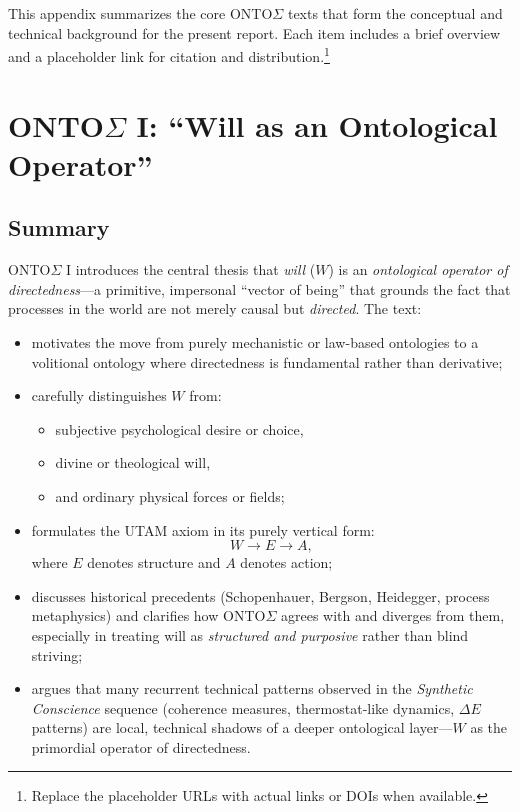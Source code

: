 \documentclass[12pt,a4paper]{report}
\newcommand{\Will}{W}
\newcommand{\Struct}{E}
\newcommand{\Act}{A}
\begin{document}
This appendix summarizes the core ONTO$\Sigma$ texts that form the conceptual and technical background for the present report. Each item includes a brief overview and a placeholder link for citation and distribution.\footnote{Replace the placeholder URLs with actual links or DOIs when available.}

\section*{ONTO$\Sigma$ I: ``Will as an Ontological Operator''}

\subsection*{Summary}

ONTO$\Sigma$ I introduces the central thesis that \emph{will} (\(\Will\)) is an \emph{ontological operator of directedness}---a primitive, impersonal ``vector of being'' that grounds the fact that processes in the world are not merely causal but \emph{directed}. The text:

\begin{itemize}[leftmargin=2em]
    \item motivates the move from purely mechanistic or law-based ontologies to a volitional ontology where directedness is fundamental rather than derivative;
    \item carefully distinguishes \(\Will\) from:
    \begin{itemize}
        \item subjective psychological desire or choice,
        \item divine or theological will,
        \item and ordinary physical forces or fields;
    \end{itemize}
    \item formulates the UTAM axiom in its purely vertical form:
    \[
        \Will \to \Struct \to \Act,
    \]
    where \(\Struct\) denotes structure and \(\Act\) denotes action;
    \item discusses historical precedents (Schopenhauer, Bergson, Heidegger, process metaphysics) and clarifies how ONTO$\Sigma$ agrees with and diverges from them, especially in treating will as \emph{structured and purposive} rather than blind striving;
    \item argues that many recurrent technical patterns observed in the \emph{Synthetic Conscience} sequence (coherence measures, thermostat-like dynamics, $\Delta E$ patterns) are local, technical shadows of a deeper ontological layer—\(\Will\) as the primordial operator of directedness.
\end{itemize}
\end{document}
